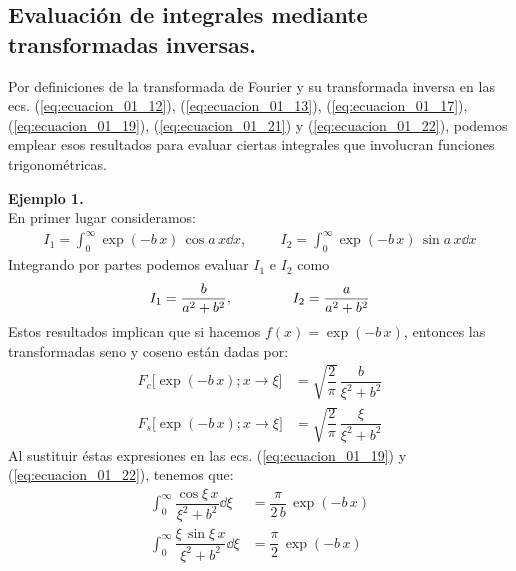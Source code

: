 \subsection{Evaluación de integrales mediante transformadas inversas.}

Por definiciones de la transformada de Fourier y su transformada inversa en las ecs. (\ref{eq:ecuacion_01_12}), (\ref{eq:ecuacion_01_13}), (\ref{eq:ecuacion_01_17}), (\ref{eq:ecuacion_01_19}), (\ref{eq:ecuacion_01_21}) y (\ref{eq:ecuacion_01_22}), podemos emplear esos resultados para evaluar ciertas integrales que involucran funciones trigonométricas. 
\bigskip

\noindent
\textbf{Ejemplo 1.}
\\
En primer lugar consideramos:
\begin{align*}
I_{1} = \int_{0}^{\infty} \exp (-b \, x) \, \cos a \, x \dd{x}, \hspace{1cm} I_{2} = \int_{0}^{\infty} \exp (-b \, x) \, \sin a \, x \dd{x}
\end{align*}
Integrando por partes podemos evaluar $I_{1}$ e $I_{2}$ como
\begin{align*}
I_{1} = \dfrac{b}{a^{2} + b^{2}},  \hspace{1.5cm} I_{2} = \dfrac{a}{a^{2} + b^{2}}
\end{align*}
Estos resultados implican que si hacemos $f(x) = \exp(-b \, x)$, entonces las transformadas seno y coseno están dadas por:
\begin{align*}
F_{c} \big[\exp(-b \, x); x \to \xi \big] &= \sqrt{\dfrac{2}{\pi}} \, \dfrac{b}{\xi^{2} + b^{2}} \\[0.5em]
F_{s} \big[\exp(-b \, x); x \to \xi \big] &= \sqrt{\dfrac{2}{\pi}} \, \dfrac{\xi}{\xi^{2} + b^{2}}
\end{align*}
Al sustituir éstas expresiones en las ecs. (\ref{eq:ecuacion_01_19}) y (\ref{eq:ecuacion_01_22}), tenemos que:
\begin{align*}
\int_{0}^{\infty} \dfrac{\cos \xi \, x}{\xi^{2} + b^{2}} \dd{\xi} &= \dfrac{\pi}{2 \, b} \, \exp(-b \, x) \\[1em]
\int_{0}^{\infty} \dfrac{\xi \, \sin \xi \, x}{\xi^{2} + b^{2}} \dd{\xi} &= \dfrac{\pi}{2} \, \exp(-b \, x)
\end{align*}
\bigskip

